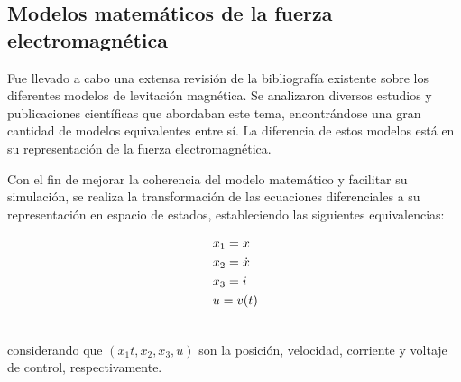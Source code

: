 \subsection{Modelos matemáticos de la fuerza electromagnética}
Fue llevado a cabo una extensa revisión de la bibliografía existente sobre los diferentes modelos de levitación magnética. Se analizaron diversos estudios y publicaciones científicas que abordaban este tema, encontrándose una gran cantidad de modelos equivalentes entre sí. La diferencia de estos modelos está en su representación de la fuerza electromagnética.

Con el fin de mejorar la coherencia del modelo matemático y facilitar su simulación, se realiza la transformación de las ecuaciones diferenciales a su representación en espacio de estados, estableciendo las siguientes equivalencias:


\begin{align*}
    &x_{1}=x \\ \thinspace
    &x_{2}=\dot{x} \\ \thinspace
    &x_{3}=i \\ \thinspace
    &u=v(t) \\ \thinspace
\end{align*} 

considerando que $(x_{1}t,x_{2},x_{3},u)$ son la posición, velocidad, corriente y voltaje de control, respectivamente.

